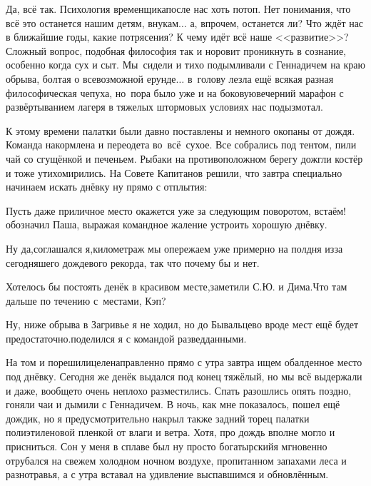 Да, всё так. Психология временщика\mdash после нас хоть потоп. Нет понимания, что всё это останется нашим детям, внукам$\ldots$ а, впрочем, останется ли? Что ждёт нас в ближайшие годы, какие потрясения? К чему идёт всё наше <<развитие>>? Сложный вопрос, подобная философия так и норовит проникнуть в сознание, особенно когда сух и сыт. Мы~сидели и тихо подымливали с Геннадичем на краю обрыва, болтая о всевозможной ерунде$\ldots$ в~голову лезла ещё всякая разная философическая чепуха, но~пора было уже и на боковую\mdash вечерний марафон с развёртыванием лагеря в тяжелых штормовых условиях нас подызмотал.

К этому времени палатки были давно поставлены и немного окопаны от дождя. Команда накормлена и переодета во~всё~сухое. Все собрались под тентом, пили чай со сгущёнкой и печеньем. Рыбаки на противоположном берегу дожгли костёр и тоже утихомирились. На Совете Капитанов решили, что завтра специально начинаем искать днёвку ну прямо с отплытия:

\diagdash Пусть даже приличное место окажется уже за следующим поворотом, встаём!\mdash обозначил Паша, выражая командное жаление устроить хорошую днёвку.

\diagdash Ну да,\mdash соглашался я,\mdash километраж мы опережаем уже примерно на полдня из\sdash за сегодняшего дождевого рекорда, так что почему бы и нет.

\diagdash Хотелось бы постоять денёк в красивом месте,\mdash заметили С.Ю. и Дима.\mdash Что там дальше по течению с~местами, Кэп? 

\diagdash Ну, ниже обрыва в Загривье я не ходил, но до Бывальцево вроде мест ещё будет предостаточно.\mdash поделился я с командой разведданными.

На том и порешили\mdash целенаправленно прямо с утра завтра ищем обалденное место под днёвку. Сегодня же денёк выдался под конец тяжёлый, но мы всё выдержали и даже, вообще\sdash то очень неплохо разместились. Спать разошлись опять поздно, гоняли чаи и дымили с Геннадичем. В ночь, как мне показалось, пошел ещё дождик, но я предусмотрительно накрыл также задний торец палатки полиэтиленовой пленкой от влаги и ветра. Хотя, про дождь вполне могло и присниться. Сон у меня в сплаве был ну просто богатырский\mdash я мгновенно отрубался на свежем холодном ночном воздухе, пропитанном запахами леса и разнотравья, а с утра вставал на удивление выспавшимся и обновлённым.%

\begin{center}
\end{center}
